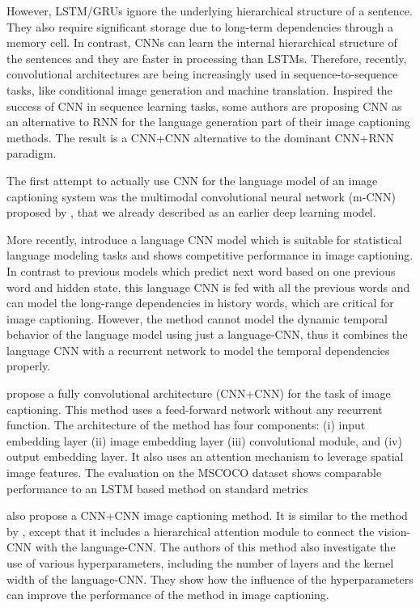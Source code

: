 However, LSTM/GRUs ignore the underlying hierarchical structure of a sentence. They also require significant storage due to long-term dependencies through a memory cell. In contrast, CNNs can learn the internal hierarchical structure of the sentences and they are faster in processing than LSTMs. Therefore, recently, convolutional architectures are being increasingly used in sequence-to-sequence tasks, like conditional image generation and machine translation. Inspired the success of CNN in sequence learning tasks, some authors are proposing CNN as an alternative to RNN for the language generation part of their image captioning methods. The result is a CNN+CNN alternative to the dominant CNN+RNN paradigm.

The first attempt to actually use CNN for the language model of an image captioning system was the multimodal convolutional neural network (m-CNN) proposed by \citet{Ma2015}, that we already described as an earlier deep learning model. 

More recently, \citet{Gu2017} introduce a language CNN model which is suitable for statistical language modeling tasks and shows competitive performance in image captioning. In contrast to previous models which predict next word based on one previous word and hidden state, this language CNN is fed with all the previous words and can model the long-range dependencies in history words, which are critical for image captioning. However, the method cannot model the dynamic temporal behavior of the language model using just a language-CNN, thus it combines the language CNN with a recurrent network to model the temporal dependencies properly.

\cite{Aneja2018} propose a fully convolutional architecture (CNN+CNN) for the task of image captioning. This method uses a feed-forward network without any recurrent function. The architecture of the method has four components: (i) input embedding layer (ii) image embedding layer (iii) convolutional module, and (iv) output embedding layer. It also uses an attention mechanism to leverage spatial image features. The evaluation on the MSCOCO dataset shows comparable performance to an LSTM based method on standard metrics

\citet{Wang2018} also propose a CNN+CNN image captioning method. It is similar to the method by \citeauthor{Aneja2018}, except that it includes a hierarchical attention module to connect the vision-CNN with the language-CNN. The authors of this method also investigate the use of various hyperparameters, including the number of layers and the kernel width of the language-CNN. They show how the influence of the hyperparameters can improve the performance of the method in image captioning.

